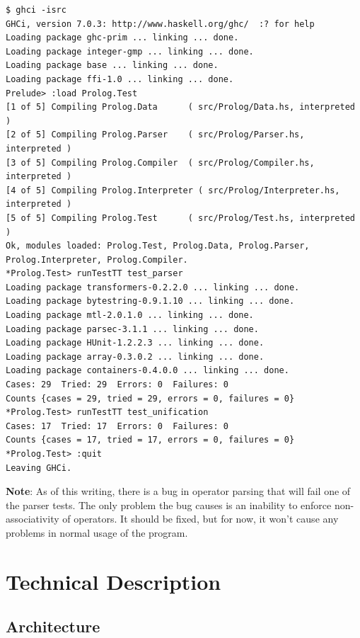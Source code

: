 \documentclass[11pt]{report}
\begin{document}
\begin{verbatim}
$ ghci -isrc
GHCi, version 7.0.3: http://www.haskell.org/ghc/  :? for help
Loading package ghc-prim ... linking ... done.
Loading package integer-gmp ... linking ... done.
Loading package base ... linking ... done.
Loading package ffi-1.0 ... linking ... done.
Prelude> :load Prolog.Test
[1 of 5] Compiling Prolog.Data      ( src/Prolog/Data.hs, interpreted )
[2 of 5] Compiling Prolog.Parser    ( src/Prolog/Parser.hs, interpreted )
[3 of 5] Compiling Prolog.Compiler  ( src/Prolog/Compiler.hs, interpreted )
[4 of 5] Compiling Prolog.Interpreter ( src/Prolog/Interpreter.hs, interpreted )
[5 of 5] Compiling Prolog.Test      ( src/Prolog/Test.hs, interpreted )
Ok, modules loaded: Prolog.Test, Prolog.Data, Prolog.Parser, Prolog.Interpreter, Prolog.Compiler.
*Prolog.Test> runTestTT test_parser
Loading package transformers-0.2.2.0 ... linking ... done.
Loading package bytestring-0.9.1.10 ... linking ... done.
Loading package mtl-2.0.1.0 ... linking ... done.
Loading package parsec-3.1.1 ... linking ... done.
Loading package HUnit-1.2.2.3 ... linking ... done.
Loading package array-0.3.0.2 ... linking ... done.
Loading package containers-0.4.0.0 ... linking ... done.
Cases: 29  Tried: 29  Errors: 0  Failures: 0
Counts {cases = 29, tried = 29, errors = 0, failures = 0}
*Prolog.Test> runTestTT test_unification
Cases: 17  Tried: 17  Errors: 0  Failures: 0
Counts {cases = 17, tried = 17, errors = 0, failures = 0}
*Prolog.Test> :quit
Leaving GHCi.
\end{verbatim}

\textbf{Note}: As of this writing, there is a bug in operator parsing that will fail one of the parser tests. The only problem the bug causes is an inability to enforce non-associativity of operators. It should be fixed, but for now, it won't cause any problems in normal usage of the program.



%
%

\chapter{Technical Description}

\section{Architecture}
\end{document}

